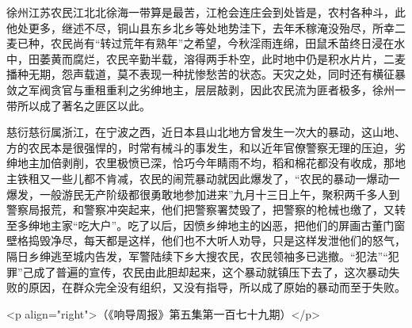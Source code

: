 徐州江苏农民江北北徐海一带算是最苦，江枪会连庄会到处皆是，农村各种斗，此他处更多，继述不尽，铜山县东乡北乡等处地势洼下，去年禾稼淹没殆尽，所幸二麦已种，农民尚有“转过荒年有熟年”之希望，今秋淫雨连绵，田鼠禾苗终日浸在水中，田萎黄而腐烂，农民辛勤半载，溶得两手朴空，此时地中仍是积水片片，二麦播种无期，怨声载道，莫不表现一种扰惨愁苦的状态。天灾之处，同时还有横征暴敛之军阀贪官与重租重利之劣绅地主，层层敲剥，因此农民流为匪者极多，徐州一带所以成了著名之匪区以此。

慈衍慈衍属浙江，在宁波之西，近日本县山北地方曾发生一次大的暴动，这山地、方的农民本是很强悍的，时常有械斗的事发生，和以近年官僚警察无理的压迫，劣绅地主加倍剥削，农里极愤已深，恰巧今年睛雨不均，稻和棉花都没有收成，那地主铁租又一些儿都不肯减，农民的闹荒暴动就因此爆发了，“农民的暴动一爆动一爆发，一般游民无产阶级都很勇敢地参加进来”九月十三日上午，聚积两千多人到警察局报荒，和警察冲突起来，他们把警察署焚毁了，把警察的枪械也缴了，又转至多绅地主家“吃大户”。吃了以后，因愤乡绅地主的凶恶，把他们的屏画古董门窗壁格捣毁净尽，每天都是这样，他们也不大听人劝导，只是这样发泄他们的怒气，隔日乡绅逃至城内告发，军警陆续下乡大搜农民，农民领袖多已逃撤。“犯法”“犯罪”己成了普遍的宣传，农民由此胆却起来，这个暴动就镇压下去了，这次暴动失败的原因，在群众完全没有组织，又没有指导，所以成了原始的暴动而至于失败。

<p align="right">（《响导周报》第五集第一百七十九期）</p>

